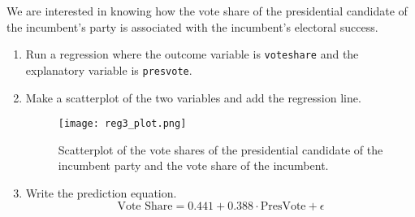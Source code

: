 \documentclass[12pt,letterpaper]{article}
\begin{document}
\noindent We are interested in knowing how the vote share of the presidential candidate of the incumbent's party is associated with the incumbent's electoral success.
	\vspace{.25cm}
	\begin{enumerate}
		\item Run a regression where the outcome variable is \texttt{voteshare} and the explanatory variable is \texttt{presvote}.
		
		
		
		
		\item Make a scatterplot of the two variables and add the regression line. 
		
			\begin{figure}[H]
			\centering
			\texttt{[image: reg3\_plot.png]}
			\caption{Scatterplot of the vote shares of the presidential candidate of the incumbent party and the vote share of the incumbent.}
		\end{figure}		
		
		\item Write the prediction equation.
		\begin{equation*}
			\text{Vote Share} = 0.441 + 0.388 \cdot \text{PresVote} + \epsilon
		\end{equation*}
		
	\end{enumerate}
	

\newpage	
\end{document}
